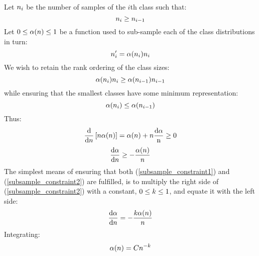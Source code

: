 Let $n_i$ be the number of samples of the $i$th class such
that:
\begin{equation}
n_i \ge n_{i-1}
\end{equation}
Let $0 \le \alpha(n) \le 1$ be a function used to sub-sample each of the class
distributions in turn:
\begin{equation}
n_i^\prime = \alpha(n_i) n_i
\end{equation}
We wish to retain the rank ordering of the class sizes:
\begin{equation}
\alpha(n_i) n_i 
\ge \alpha(n_{i-1}) n_{i-1} 
\end{equation}
while ensuring that the smallest classes have some minimum representation:
\begin{equation}
\alpha(n_i) \le \alpha(n_{i-1})
\label{subsample_constraint1}
\end{equation}
Thus:
\begin{equation}
	\frac{\mathrm d}{\mathrm d n} \left [ n \alpha(n) \right ] = \alpha(n) + n \frac{\mathrm d \alpha}{\mathrm n} \ge 0
\end{equation}
\begin{equation}
	\frac{\mathrm d \alpha}{\mathrm d n} \ge - \frac{\alpha(n)}{n}
\label{subsample_constraint2}
\end{equation}
The simplest means of ensuring that both (\ref{subsample_constraint1}) and
(\ref{subsample_constraint2}) are fulfilled, is to multiply the right side
of (\ref{subsample_constraint2}) with a constant, $0 \le k \le 1$,
and equate it with the left side:
\begin{equation}
	\frac{\mathrm d \alpha}{\mathrm d n} = - \frac{k \alpha(n)}{n}
\end{equation}
Integrating:
\begin{equation}
	\alpha(n)=C n^{-k}
\end{equation}


